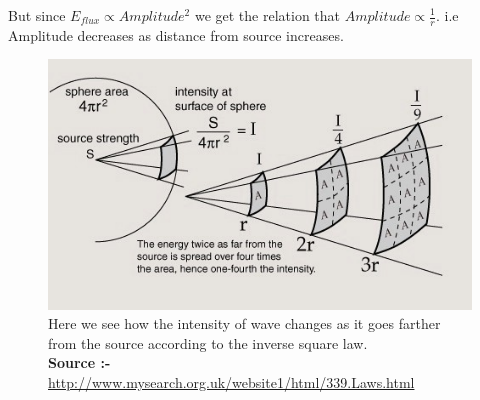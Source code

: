 \noindent But since $E_{flux} \propto Amplitude^2$ we get the relation that $Amplitude \propto \frac{1}{r}$. i.e Amplitude decreases as distance from source increases. 

\begin{figure}[h]
    \centering
    \includegraphics[scale=1.05]{images.tex/inverse_square.jpeg}
    \caption{ Here we see how the intensity of wave changes as it goes farther from the source according to the inverse square law.\\
    \textbf{Source :-} \url{http://www.mysearch.org.uk/website1/html/339.Laws.html}}
\end{figure}

\pagebreak
